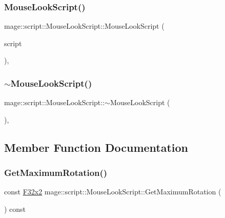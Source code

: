 \subsubsection{\texorpdfstring{Mouse\+Look\+Script()}{MouseLookScript()}\hspace{0.1cm}{\footnotesize\ttfamily [3/3]}}
{\footnotesize\ttfamily mage\+::script\+::\+Mouse\+Look\+Script\+::\+Mouse\+Look\+Script (\begin{DoxyParamCaption}\item[{\hyperlink{classmage_1_1script_1_1_mouse_look_script}{Mouse\+Look\+Script} \&\&}]{script }\end{DoxyParamCaption})\hspace{0.3cm}{\ttfamily [default]}, {\ttfamily [noexcept]}}

\hypertarget{classmage_1_1script_1_1_mouse_look_script_a29a6d2cb4742fbf745822d015e72484f}{}\label{classmage_1_1script_1_1_mouse_look_script_a29a6d2cb4742fbf745822d015e72484f} 
\subsubsection{\texorpdfstring{$\sim$\+Mouse\+Look\+Script()}{~MouseLookScript()}}
{\footnotesize\ttfamily mage\+::script\+::\+Mouse\+Look\+Script\+::$\sim$\+Mouse\+Look\+Script (\begin{DoxyParamCaption}{ }\end{DoxyParamCaption})\hspace{0.3cm}{\ttfamily [virtual]}, {\ttfamily [default]}}



\subsection{Member Function Documentation}
\hypertarget{classmage_1_1script_1_1_mouse_look_script_a2ceb928a903baf5b30ea99e321af671c}{}\label{classmage_1_1script_1_1_mouse_look_script_a2ceb928a903baf5b30ea99e321af671c} 
\subsubsection{\texorpdfstring{Get\+Maximum\+Rotation()}{GetMaximumRotation()}}
{\footnotesize\ttfamily const \hyperlink{namespacemage_aa87237ad091f5cd7da612b8523fc108f}{F32x2} mage\+::script\+::\+Mouse\+Look\+Script\+::\+Get\+Maximum\+Rotation (\begin{DoxyParamCaption}{ }\end{DoxyParamCaption}) const\hspace{0.3cm}{\ttfamily [noexcept]}}


